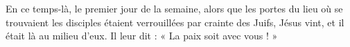 En ce temps-là, le premier jour de la semaine, alors que les portes du lieu où se trouvaient les disciples étaient verrouillées par crainte des Juifs, Jésus vint, et il était là au milieu d’eux. Il leur dit : « La paix soit avec vous ! »
